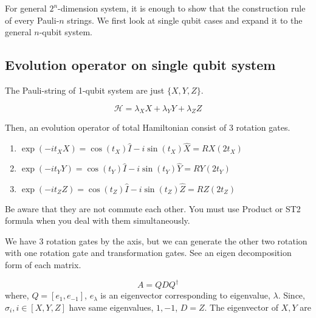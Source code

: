 For general $2^n$-dimension system, it is enough to show that the construction rule of every Pauli-$n$ strings.
We first look at single qubit cases and expand it to the general $n$-qubit system.

\subsection{Evolution operator on single qubit system}

The Pauli-string of 1-qubit system are just $\{X, Y, Z\}$.

\begin{equation}
    \mathcal{H} = \lambda_{X} X + \lambda_{Y} Y + \lambda_{Z} Z
\end{equation}

Then, an evolution operator of total Hamiltonian consist of 
3 rotation gates.

\begin{enumerate}
    \item $\exp(-i t_{X} X) = \cos(t_{X}) \hat{I} - i \sin(t_{X}) \hat{X} = RX(2t_{X})$
    \item $\exp(-i t_{Y} Y) = \cos(t_{Y}) \hat{I} - i \sin(t_{Y}) \hat{Y} = RY(2t_{Y})$
    \item $\exp(-i t_{Z} Z) = \cos(t_{Z}) \hat{I} - i \sin(t_{Z}) \hat{Z} = RZ(2t_{Z})$
\end{enumerate}

Be aware that they are not commute each other. 
You must use Product or ST2 formula when you deal with them simultaneously.

We have 3 rotation gates by the axis, but we can generate the other two rotation with one rotation gate and 
transformation gates. 
See an eigen decomposition form of each matrix.

\begin{equation}
    A = Q D Q^{\dagger}
\end{equation}
where, $Q = [e_1, e_{-1}]$, $e_{\lambda}$ is an eigenvector corresponding to eigenvalue, $\lambda$.
Since, $\sigma_{i}, i \in [X, Y, Z]$ have same eigenvalues, $1, -1$, $D = Z$.
The eigenvector of $X, Y$ are

